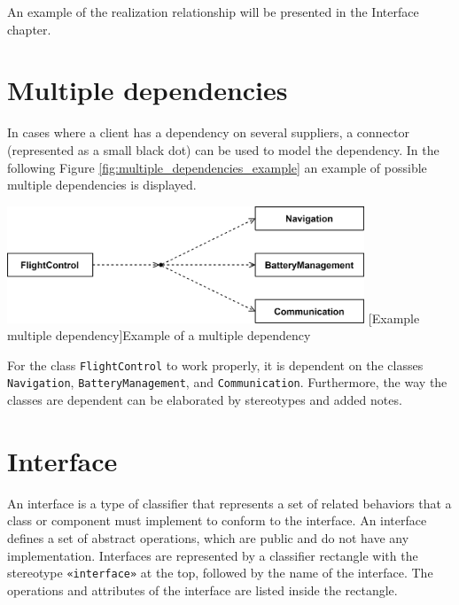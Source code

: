 \documentclass[
	12pt,
    a4paper,
    egregdoesnotlikesansseriftitles, %
    toc=chapterentrywithdots,
    oneside, openany,
    titlepage,
    parskip=half,
    headings=normal,  %
    listof=totoc,
    bibliography=totoc,
    index=totoc,
    captions=tableheading,  %
    listof=flat,
    numbers=noenddot, %
    final]
    {scrbook}
\begin{document}
An example of the realization relationship will be presented in the Interface chapter.


\section{Multiple dependencies}

In cases where a client has a dependency on several suppliers, a connector (represented as a small black dot) can be used to model the dependency.  \cite[p. 160]{uml}
In the following Figure \ref{fig:multiple_dependencies_example} an example of possible multiple dependencies is displayed.

\vspace{1em}
\begin{minipage}{\linewidth}
	\centering
	\includegraphics[width=0.8\textwidth]{figures/dependencies/multiple_dependencies.jpg}
	[Example multiple dependency]{Example of a multiple dependency}
	\label{fig:multiple_dependencies_example}
\end{minipage}
\vspace{1em}


For the class \texttt{FlightControl} to work properly, it is dependent on the classes \texttt{Navigation}, \texttt{BatteryManagement}, and \texttt{Communication}.
Furthermore, the way the classes are dependent can be elaborated by stereotypes and added notes.

\section{Interface}

An interface is a type of classifier that represents a set of related behaviors that a class or component must implement to conform to the interface. 
An interface defines a set of abstract operations, which are public and do not have any implementation.
Interfaces are represented by a classifier rectangle with the stereotype \texttt{«interface»} at the top, followed by the name of the interface. 
The operations and attributes of the interface are listed inside the rectangle. \cite[p. 130-131]{uml}
\end{document}
